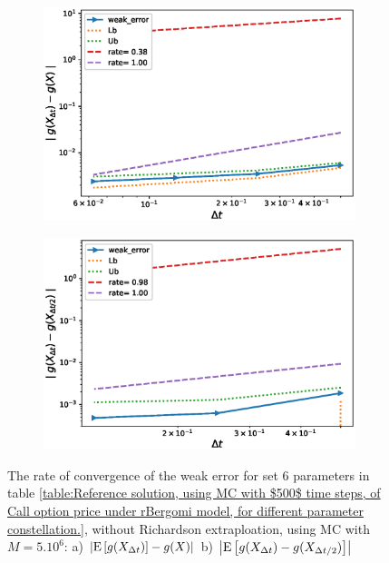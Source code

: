 \documentclass[11pt]{article}
\newcommand{\expt}[1]{\mathrm{E}\left[#1\right]}
\begin{document}
\begin{figure}[!htb]
	\centering
	\begin{subfigure}{.4\textwidth}
		\centering
		\includegraphics[width=1\linewidth]{./figures/rBergomi_weak_error_rates/without_richardson/H_002/weak_convergence_order_Bergomi_H_002_K_08_M_5_10_6_CI_relative}
		\caption{}
		\label{fig:sub3}
	\end{subfigure}%
	\begin{subfigure}{.4\textwidth}
		\centering
		\includegraphics[width=1\linewidth]{./figures/rBergomi_weak_error_rates/without_richardson/H_002/weak_convergence_order_differences_Bergomi_H_002_K_08_M_5_10_6_CI_relative}
		\caption{}
		\label{fig:sub4}
	\end{subfigure}
	
	\caption{The rate of convergence of the weak error for set $6$ parameters in table \ref{table:Reference solution, using MC with $500$ time steps, of Call option price under rBergomi model, for different parameter constellation.}, without Richardson extraploation, using MC with $M=5.10^6$: a) $\abs{\expt{g(X_{\Delta t})}-g(X)}$  b) $\abs{\expt{g(X_{\Delta t})-g(X_{\Delta t/2})}}$ }
	\label{fig:Weak_rate_H_002_without_rich_K_08}
\end{figure}
\end{document}

